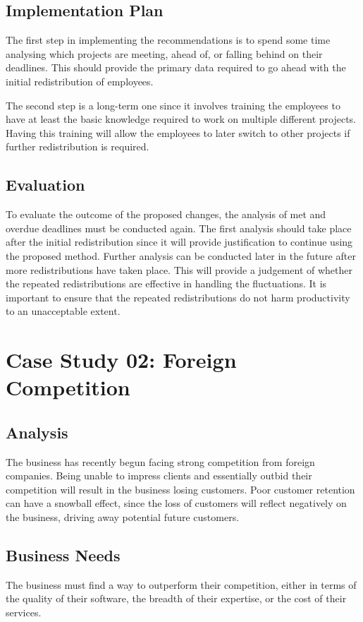 \documentclass{article}
\begin{document}
\subsection{Implementation Plan}
The first step in implementing the recommendations is to spend some time analysing which projects are meeting, ahead of, or falling behind on their deadlines. This should provide the primary data required to go ahead with the initial redistribution of employees.

The second step is a long-term one since it involves training the employees to have at least the basic knowledge required to work on multiple different projects. Having this training will allow the employees to later switch to other projects if further redistribution is required.

\subsection{Evaluation}
To evaluate the outcome of the proposed changes, the analysis of met and overdue deadlines must be conducted again. The first analysis should take place after the initial redistribution since it will provide justification to continue using the proposed method. Further analysis can be conducted later in the future after more redistributions have taken place. This will provide a judgement of whether the repeated redistributions are effective in handling the fluctuations. It is important to ensure that the repeated redistributions do not harm productivity to an unacceptable extent.

\newpage

\section{Case Study 02: Foreign Competition}
\subsection{Analysis}
The business has recently begun facing strong competition from foreign companies. Being unable to impress clients and essentially outbid their competition will result in the business losing customers. Poor customer retention can have a snowball effect, since the loss of customers will reflect negatively on the business, driving away potential future customers.

\subsection{Business Needs}
The business must find a way to outperform their competition, either in terms of the quality of their software, the breadth of their expertise, or the cost of their services.
\end{document}
